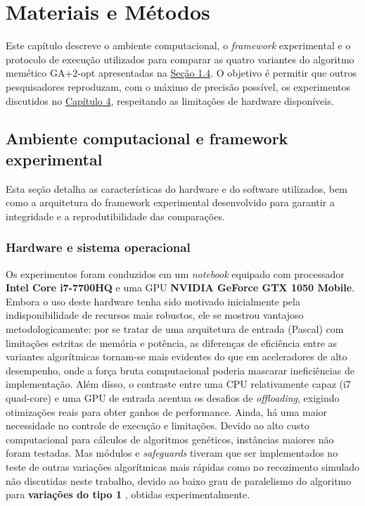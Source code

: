 \chapter{Materiais e Métodos}\label{cap3-materiais-metodos}

Este capítulo descreve o ambiente computacional, o \emph{framework} experimental e o protocolo de execução utilizados para comparar as quatro variantes do algoritmo memético GA+\(2\)-opt apresentadas na \hyperref[sec-14-objetivos-especificos]{Seção 1.4}. O objetivo é permitir que outros pesquisadores reproduzam, com o máximo de precisão possível, os experimentos discutidos no \hyperref[cap4-resultados]{Capítulo 4}, respeitando as limitações de hardware disponíveis.

\section{Ambiente computacional e framework experimental}\label{sec-31-ambiente-framework}

Esta seção detalha as características do hardware e do software utilizados, bem como a arquitetura do framework experimental desenvolvido para garantir a integridade e a reprodutibilidade das comparações.

\subsection{Hardware e sistema operacional}\label{sec-311-hardware-software}

Os experimentos foram conduzidos em um \emph{notebook} equipado com processador \textbf{Intel Core i7-7700HQ} e uma GPU \textbf{NVIDIA GeForce GTX 1050 Mobile}. Embora o uso deste hardware tenha sido motivado inicialmente pela indisponibilidade de recursos mais robustos, ele se mostrou vantajoso metodologicamente: por se tratar de uma arquitetura de entrada (Pascal) com limitações estritas de memória e potência, as diferenças de eficiência entre as variantes algorítmicas tornam-se mais evidentes do que em aceleradores de alto desempenho, onde a força bruta computacional poderia mascarar ineficiências de implementação. Além disso, o contraste entre uma CPU relativamente capaz (i7 quad-core) e uma GPU de entrada acentua os desafios de \emph{offloading}, exigindo otimizações reais para obter ganhos de performance. Ainda, há uma maior necessidade no controle de execução e limitações. Devido ao alto custo computacional para cálculos de algoritmos genéticos, instâncias maiores não foram testadas. Mas módulos e \emph{safeguards} tiveram que ser implementados no teste de outras variações algorítmicas mais rápidas como no recozimento simulado \autocite{wu2013performance} não discutidas neste trabalho, devido ao baixo grau de paralelismo do algoritmo para \textbf{variações do tipo 1} \autocite{crainic2003parallel}, obtidas experimentalmente.

